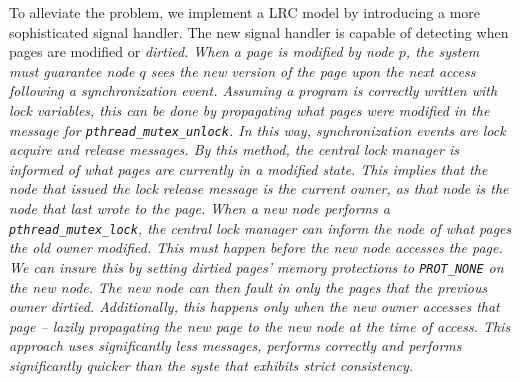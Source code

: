 To alleviate the problem, we implement a LRC model by introducing a more sophisticated signal handler.  The new signal handler is capable of detecting when pages are modified or \em dirtied\em.  When a page is modified by node $p$, the system must guarantee node $q$ sees the new version of the page upon the next access following a synchronization event.  Assuming a program is correctly written with lock variables, this can be done by propagating what pages were modified in the message for \verb,pthread_mutex_unlock,.  In this way, synchronization events are lock acquire and release messages.  By this method, the central lock manager is informed of what pages are currently in a modified state.  This implies that the node that issued the lock release message is the current owner, as that node is the node that last wrote to the page.  When a new node performs a \verb,pthread_mutex_lock,, the central lock manager can inform the node of what pages the old owner modified.  This must happen before the new node accesses the page.  We can insure this by setting dirtied pages' memory protections to \verb,PROT_NONE, on the new node.  The new node can then fault in only the pages that the previous owner dirtied.  Additionally, this happens only when the new owner accesses that page -- lazily propagating the new page to the new node at the time of access.  This approach uses significantly less messages, performs correctly and performs significantly quicker than the syste that exhibits \em strict consistency\em.





